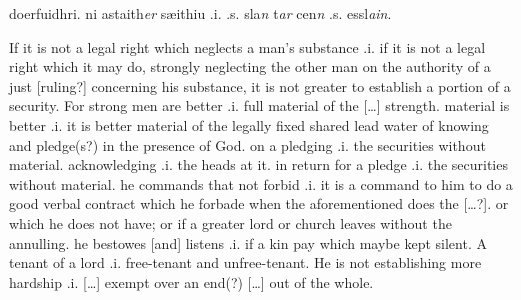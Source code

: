 \documentclass[11pt]{article}
\begin{document}
\begin{pages}
\begin{Leftside}
doerfuidhri.  ni astaith\emph{er} sæithiu .i. .s. sla\emph{n} t\emph{ar} cen\emph{n} .s. essl\emph{ain}.
    
    \pend
  \endnumbering
  \end{Leftside}

\begin{Rightside}
    \beginnumbering\pstart
    If it is not a legal right which neglects a man's substance .i. if it is not a legal right which it may do, strongly neglecting the other man on the authority of a just [ruling?] concerning his substance, it is not greater to establish a portion of a security.  For strong men are better .i. full material of the [\ldots] strength. material is better .i. it is better material of the legally fixed shared lead water of knowing and pledge(s?) in the presence of God.  on a pledging .i. the securities without material. acknowledging .i. the heads at it.  in return for a pledge .i. the securities without material.  he commands that not forbid .i. it is a command to him to do a good verbal contract which he forbade when the aforementioned does the [\ldots?].  or which he does not have; or if a greater lord or church leaves without the annulling.  he bestowes [and] listens .i. if a kin pay which maybe kept silent.  A tenant of a lord .i. free-tenant and unfree-tenant. He is not establishing more hardship .i. [\ldots] exempt over an end(?) [\ldots] out of the whole. 
    \pend
    \endnumbering
  \end{Rightside}

  \Pages
\end{pages}
\end{document}
